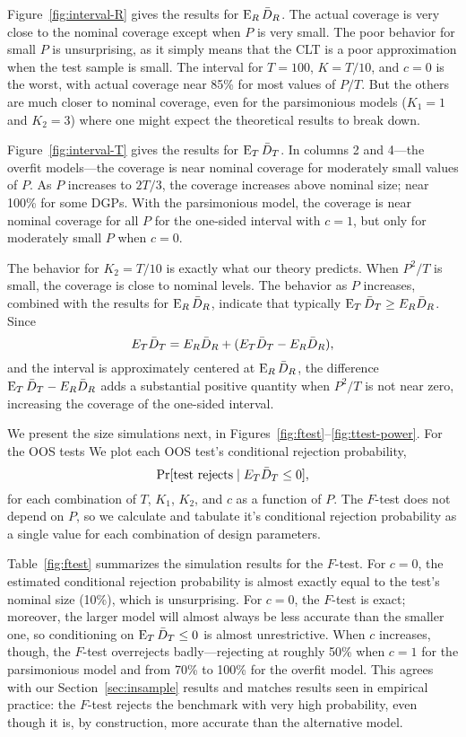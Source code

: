 \documentclass[12pt]{article}
\begin{document}
Figure~\ref{fig:interval-R} gives the results for $\operatorname{E}_R \bar{D}_{R}$.  The
actual coverage is very close to the nominal coverage except when $P$
is very small.  The poor behavior for small $P$ is unsurprising, as it
simply means that the CLT is a poor approximation when the test sample
is small. The interval for $T = 100$, $K = T/10$, and $c = 0$ is the
worst, with actual coverage near 85\% for most values of $P/T$. But
the others are much closer to nominal coverage, even for the
parsimonious models ($K_1=1$ and $K_2= 3$) where one might expect
the theoretical results to break down.

Figure~\ref{fig:interval-T} gives the results for $\operatorname{E}_T \bar{D}_{T}$.  In
columns 2 and 4---the overfit models---the coverage is near nominal
coverage for moderately small values of $P$.  As $P$ increases to
$2T/3$, the coverage increases above nominal size; near 100\% for some
DGPs.  With the parsimonious model, the coverage is near nominal
coverage for all $P$ for the one-sided interval with $c=1$, but only
for moderately small $P$ when $c=0$.

The behavior for $K_2 = T/10$ is exactly what our theory predicts.
When $P^2/T$ is small, the coverage is close to nominal levels.  The
behavior as $P$ increases, combined with the results for $\operatorname{E}_R \bar{D}_{R}$,
indicate that typically $\operatorname{E}_T \bar{D}_{T} \geq E_R \bar{D}_{R}$.  Since
\begin{equation*}
  E_{T} \bar{D}_{T} = E_{R} \bar{D}_{R} + (E_{T} \bar{D}_{T} - E_{R} \bar{D}_{R}),
\end{equation*}
and the interval is approximately centered at $\operatorname{E}_R \bar{D}_{R}$, the
difference $\operatorname{E}_{T} \bar{D}_{T} - E_{R} \bar{D}_{R}$ adds a substantial positive
quantity when $P^2/T$ is not near zero, increasing the coverage of the
one-sided interval.

We present the size simulations next, in
Figures~\ref{fig:ftest}--\ref{fig:ttest-power}.  For the OOS tests
We plot each OOS test's conditional rejection probability,
\begin{equation*}
  \Pr[\text{test rejects} \mid E_T \bar{D}_{T} \leq 0],
\end{equation*}
for each combination of $T$, $K_1$, $K_2$, and $c$ as a function of
$P$.  The $F$-test does not depend on $P$, so we calculate and
tabulate it's conditional rejection probability as a single value for
each combination of design parameters.

Table~\ref{fig:ftest} summarizes the simulation results for the
$F$-test. For $c = 0$, the estimated conditional rejection probability
is almost exactly equal to the test's nominal size (10\%), which is
unsurprising.  For $c = 0$, the $F$-test is exact; moreover, the
larger model will almost always be less accurate than the smaller one,
so conditioning on $\operatorname{E}_T \bar{D}_{T} \leq 0$ is almost unrestrictive.  When
$c$ increases, though, the $F$-test overrejects badly---rejecting at
roughly 50\% when $c = 1$ for the parsimonious model and from 70\% to
100\% for the overfit model. This agrees with our
Section~\ref{sec:insample} results and matches results seen in
empirical practice: the $F$-test rejects the benchmark with very high
probability, even though it is, by construction, more accurate than
the alternative model.
\end{document}

